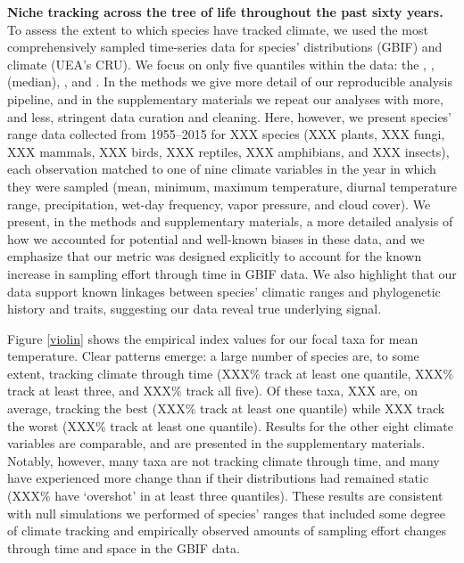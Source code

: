 \documentclass[12pt]{report}
\begin{document}
\textbf{Niche tracking across the tree of life throughout the past
  sixty years.} To assess the extent to which species have tracked
climate, we used the most comprehensively sampled time-series data for
species' distributions (GBIF\supercite{xxx}) and climate (UEA's
CRU\supercite{xxx}). We focus on only five quantiles within the data:
the , ,  (median), , and . In
the methods we give more detail of our reproducible analysis pipeline,
and in the supplementary materials we repeat our analyses with more,
and less, stringent data curation and cleaning. Here, however, we
present species' range data collected from 1955--2015 for XXX species
(XXX plants, XXX fungi, XXX mammals, XXX birds, XXX reptiles, XXX
amphibians, and XXX insects), each observation matched to one of nine
climate variables in the year in which they were sampled (mean,
minimum, maximum temperature, diurnal temperature range,
precipitation, wet-day frequency, vapor pressure, and cloud
cover). We present, in the methods and supplementary materials, a more
detailed analysis of how we accounted for potential and
well-known\supercite{xxx} biases in these data, and we emphasize that
our metric was designed explicitly to account for the known increase
in sampling effort through time in GBIF data. We also highlight that
our data support known linkages between species' climatic ranges and
phylogenetic history and traits, suggesting our data reveal true
underlying signal.

Figure \ref{violin} shows the empirical index values for our focal
taxa for mean temperature. Clear patterns emerge: a large number of
species are, to some extent, tracking climate through time (XXX\%
track at least one quantile, XXX\% track at least three, and XXX\%
track all five). Of these taxa, XXX are, on average, tracking the best
(XXX\% track at least one quantile) while XXX track the worst (XXX\%
track at least one quantile).
Results for the other eight climate variables are comparable, and are
presented in the supplementary materials. Notably, however, many taxa
are not tracking climate through time, and many have experienced more
change than if their distributions had remained static (XXX\% have
`overshot' in at least three quantiles). These results are consistent
with null simulations we performed of species' ranges that included
some degree of climate tracking and empirically observed amounts of
sampling effort changes through time and space in the GBIF data.
\end{document}
